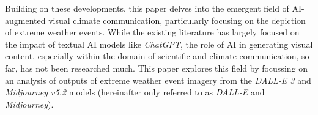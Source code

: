 Building on these developments, this paper delves into the emergent field of AI-augmented visual climate communication, particularly focusing on the depiction of extreme weather events. While the existing literature has largely focused on the impact of textual AI models like \textit{ChatGPT}, the role of AI in generating visual content, especially within the domain of scientific and climate communication, so far, has not been researched much. This paper explores this field by focussing on an analysis of outputs of extreme weather event imagery  from the \textit{DALL-E 3} and \textit{Midjourney v5.2} models (hereinafter only referred to as \textit{DALL-E} and \textit{Midjourney}).
